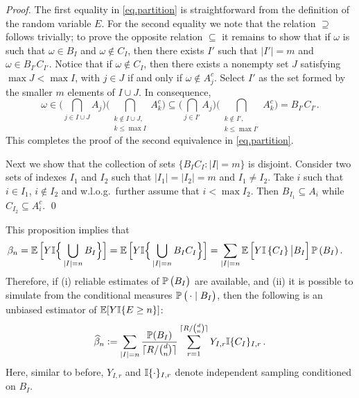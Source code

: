 \begin{proof}
 
 The first equality in \eqref{eq.partition} is straightforward from the definition of
 the random variable $E$. For the second equality
 we note that the relation $\boldsymbol{\supseteq}$ follows trivially;
 to prove the opposite relation $\boldsymbol{\subseteq}$ it remains to show that
 if  $\omega$ is such that $\omega\in B_I$ and $\omega\notin C_I$, 
 then there exists $I'$ such that $|I'|=m$ and $\omega\in B_{I'}C_{I'}$.  Notice that
 if $\omega\notin C_I$, then there exists a nonempty set $J$ satisfying 
 $\max J<\max I$, with $j\in J$ if and only if $\omega\notin A_j^c$. 
 Select $I'$ as the set formed
 by the smaller $m$ elements of $I\cup J$.  In consequence,
 \begin{equation*}
  \omega\in
  \Big(\bigcap_{j\in I\cup J}A_j\Big) \Big(\bigcap_{\substack{k\notin I\cup J,\\k\le\max I}} A_k^c\Big)
  \subseteq
  \Big(\bigcap_{j\in I'}A_j\Big) \Big(\bigcap_{\substack{k\notin I',\\k\le\max I'}} A_k^c\Big)
  =B_{I'}C_{I'}.
 \end{equation*}  
 This completes the proof of the second equivalence in \eqref{eq.partition}.
 
 Next we show that the collection of sets $\{B_IC_I:|I|=m\}$ is disjoint.  Consider two sets of indexes
 $I_1$ and $I_2$ such that
 $|I_1|=|I_2|=m$ and $I_1\neq I_2$. Take $i$ such that
 $i\in I_1$, $i\notin I_2$ and w.l.o.g.\ further assume that $i<\max I_2$.  
 Then $B_{I_1}\subseteq A_i$ while $C_{I_2}\subseteq A_i^c$. \qed
\end{proof}
This proposition implies that
 \begin{align*}
  \beta_n&=\Exp\Big[Y\Ind\Big\{\bigcup_{|I|=n} B_I\Big\}\Big]
    =\Exp\Big[Y\Ind\Big\{\bigcup_{|I|=n} B_IC_I\Big\}\Big] %
  =\sum_{|I|=n}\Exp\left[Y\Ind\left\{C_I\right\}  
     \big|B_I\right]\Prob\left(B_I\right).
 \end{align*}  
  Therefore, if (i)
 reliable estimates of  $\operatorname{{\mathbb P}}\big(B_I\big)$ are available, and
 (ii) it is possible to simulate from the conditional measures
 $\operatorname{{\mathbb P}}\left(\, \cdot \mid B_I\right)$,
then the following is an unbiased estimator of $\operatorname{{\mathbb E}}[Y\mathbb I\{E\ge n\}]$:
 \begin{equation}\label{beta_hat}
 \widehat{\beta}_n
   :=\sum_{|I|=n} \frac{ \operatorname{{\mathbb P}}(B_I) }{\lceil R/\binom{d}{n} \rceil} 
   \sum_{r=1}^{\lceil R/\binom{d}{n} \rceil}
   Y_{I,r} \mathbb I\{ C_I \}_{I,r} \,.
 \end{equation}
 Here, similar to before, $Y_{I,r}$ and $\mathbb I\{ \cdot \}_{I,r}$ denote independent sampling conditioned on $B_I$.
 
